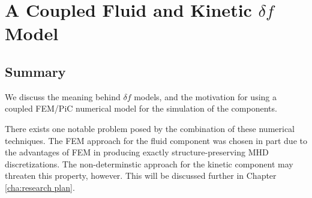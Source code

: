 \chapter{A Coupled Fluid and Kinetic $\delta\!f$ Model}\label{cha:delta f correction}
    

    
    


    \section*{Summary}
        We discuss the meaning behind $\delta\!f$ models, and the motivation for using a coupled FEM/PiC numerical model for the simulation of the components.
        
        There exists one notable problem posed by the combination of these numerical techniques. The FEM approach for the fluid component was chosen in part due to the advantages of FEM in producing exactly structure-preserving MHD discretizations. The non-determinstic approach for the kinetic component may threaten this property, however. This will be discussed further in Chapter \ref{cha:research plan}.
    